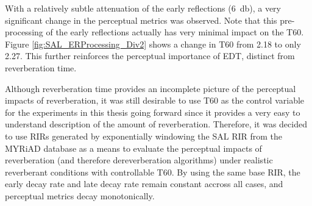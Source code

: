 With a relatively subtle attenuation of the early reflections (\qty{6}{\decibel}), a very significant change in the perceptual metrics was observed. Note that this pre-processing of the early reflections actually has very minimal impact on the T60. Figure \ref{fig:SAL_ERProcessing_Div2} shows a change in T60 from \qty{2.18}{\sec} to only \qty{2.27}{\sec}. This further reinforces the perceptual importance of EDT, distinct from reverberation time.

Although reverberation time provides an incomplete picture of the perceptual impacts of reverberation, it was still desirable to use T60 as the control variable for the experiments in this thesis going forward since it provides a very easy to understand description of the amount of reverberation. Therefore, it was decided to use RIRs generated by exponentially windowing the SAL RIR from the MYRiAD database as a means to evaluate the perceptual impacts of reverberation (and therefore dereverberation algorithms) under realistic reverberant conditions with controllable T60. By using the same base RIR, the early decay rate and late decay rate remain constant accross all cases, and perceptual metrics decay monotonically.











